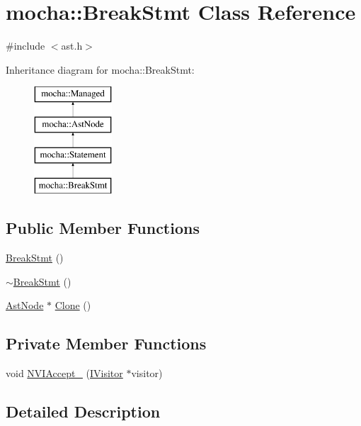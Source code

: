 \hypertarget{classmocha_1_1_break_stmt}{
\section{mocha::BreakStmt Class Reference}
\label{classmocha_1_1_break_stmt}
}


{\ttfamily \#include $<$ast.h$>$}

Inheritance diagram for mocha::BreakStmt:\begin{figure}[H]
\begin{center}
\leavevmode
\includegraphics[height=4.000000cm]{classmocha_1_1_break_stmt}
\end{center}
\end{figure}
\subsection*{Public Member Functions}
\begin{DoxyCompactItemize}
\item 
\hyperlink{classmocha_1_1_break_stmt_a3c26cc24864d473c19150136bf5a3342}{BreakStmt} ()
\item 
\hyperlink{classmocha_1_1_break_stmt_a277a804ed1654c73d36f4718eef74729}{$\sim$BreakStmt} ()
\item 
\hyperlink{classmocha_1_1_ast_node}{AstNode} $\ast$ \hyperlink{classmocha_1_1_break_stmt_aef2636aaf779e433b3a3adbc873444dd}{Clone} ()
\end{DoxyCompactItemize}
\subsection*{Private Member Functions}
\begin{DoxyCompactItemize}
\item 
void \hyperlink{classmocha_1_1_break_stmt_a73d4722ff7fccc9a62e7a2fb562bc7b6}{NVIAccept\_\-} (\hyperlink{classmocha_1_1_i_visitor}{IVisitor} $\ast$visitor)
\end{DoxyCompactItemize}


\subsection{Detailed Description}


